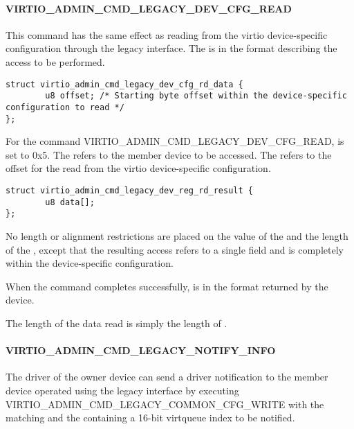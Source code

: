 \paragraph{VIRTIO_ADMIN_CMD_LEGACY_DEV_CFG_READ}
\label{par:Basic Facilities of a Virtio Device / Device groups / Group administration commands / Legacy Interface / VIRTIO-ADMIN-CMD-LEGACY-DEV-CFG-READ}

This command has the same effect as reading from the virtio device-specific
configuration through the legacy interface. The  is in
the format  describing
the access to be performed.

\begin{lstlisting}
struct virtio_admin_cmd_legacy_dev_cfg_rd_data {
        u8 offset; /* Starting byte offset within the device-specific configuration to read */
};
\end{lstlisting}

For the command VIRTIO_ADMIN_CMD_LEGACY_DEV_CFG_READ, 
is set to 0x5.
The  refers to the member device to be accessed.
The  refers to the offset for the read from the virtio device-specific
configuration.

\begin{lstlisting}
struct virtio_admin_cmd_legacy_dev_reg_rd_result {
        u8 data[];
};
\end{lstlisting}

No length or alignment restrictions are placed on the value of the
 and the length of the , except that the resulting
access refers to a single field and is completely within the device-specific
configuration.

When the command completes successfully,  is in
the format 
returned by the device.

The length of the data read is simply the length of .

\paragraph{VIRTIO_ADMIN_CMD_LEGACY_NOTIFY_INFO}
\label{par:Basic Facilities of a Virtio Device / Device groups / Group administration commands / Legacy Interface / VIRTIO-ADMIN-CMD-LEGACY-NOTIFY-INFO}

The driver of the owner device can send a driver notification to the member
device operated using the legacy interface by executing
VIRTIO_ADMIN_CMD_LEGACY_COMMON_CFG_WRITE with the  matching
 and the  containing a 16-bit virtqueue index to
be notified.


